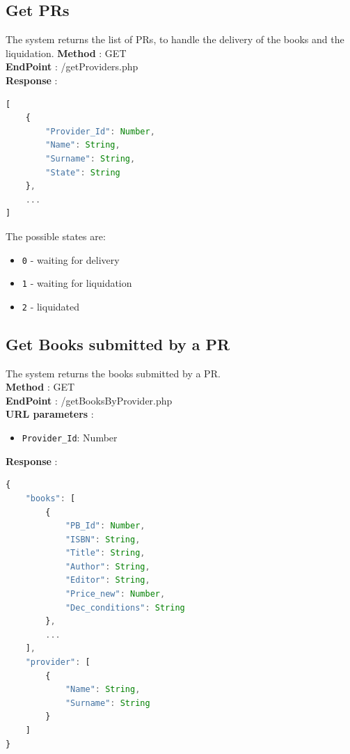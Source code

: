 \subsection{Get PRs}
The system returns the list of PRs, to handle the delivery of the books and the liquidation.
\textbf{Method} : GET \\
\textbf{EndPoint} : /getProviders.php \\
\textbf{Response} :
\begin{lstlisting}[language=JavaScript, label={lst:jscode}, basicstyle=\ttfamily]
[
    {
        "Provider_Id": Number,
        "Name": String,
        "Surname": String,
        "State": String
    },
    ...
]
\end{lstlisting}
The possible states are:
\begin{itemize}
    \item \texttt{0} - waiting for delivery
    \item \texttt{1} - waiting for liquidation
    \item \texttt{2} - liquidated
\end{itemize}

\subsection{Get Books submitted by a PR}
The system returns the books submitted by a PR.\\
\textbf{Method} : GET \\
\textbf{EndPoint} : /getBooksByProvider.php \\
\textbf{URL parameters} :
\begin{itemize}
    \item \texttt{Provider\_Id}: Number
\end{itemize}
\textbf{Response} :
\begin{lstlisting}[language=JavaScript, label={lst:jscode}, basicstyle=\ttfamily]
{
    "books": [
        {
            "PB_Id": Number,
            "ISBN": String,
            "Title": String,
            "Author": String,
            "Editor": String,
            "Price_new": Number,
            "Dec_conditions": String
        },
        ...
    ],
    "provider": [
        {
            "Name": String,
            "Surname": String
        }
    ]
}
\end{lstlisting}

